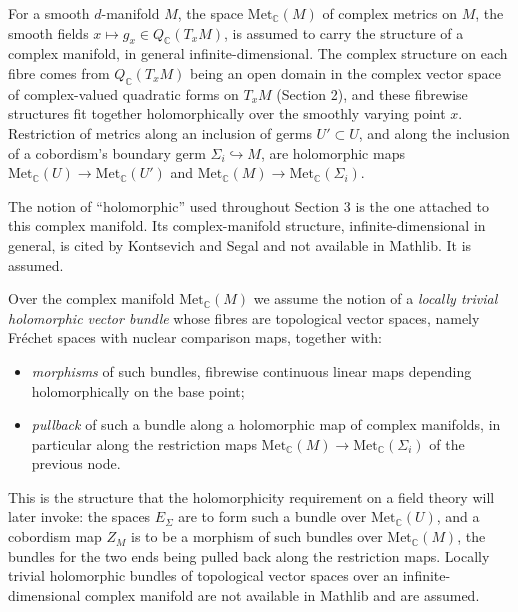 \begin{definition}
  \label{def:metc-complex-manifold}
  \notready
  For a smooth $d$-manifold $M$, the space $\mathrm{Met}_{\mathbb C}(M)$ of
  complex metrics on $M$, the smooth fields
  $x \mapsto g_x \in Q_{\mathbb C}(T_x M)$, is assumed to carry the structure of
  a complex manifold, in general infinite-dimensional. The complex structure on
  each fibre comes from $Q_{\mathbb C}(T_x M)$ being an open domain in the
  complex vector space of complex-valued quadratic forms on $T_x M$ (Section 2),
  and these fibrewise structures fit together holomorphically over the smoothly
  varying point $x$. Restriction of metrics along an inclusion of germs
  $U' \subset U$, and along the inclusion of a cobordism's boundary germ
  $\Sigma_i \hookrightarrow M$, are holomorphic maps
  $\mathrm{Met}_{\mathbb C}(U) \to \mathrm{Met}_{\mathbb C}(U')$ and
  $\mathrm{Met}_{\mathbb C}(M) \to \mathrm{Met}_{\mathbb C}(\Sigma_i)$.

  The notion of ``holomorphic'' used throughout Section 3 is the one attached to
  this complex manifold. Its complex-manifold structure, infinite-dimensional in
  general, is cited by Kontsevich and Segal and not available in Mathlib. It is
  assumed.
\end{definition}

\begin{definition}
  \label{def:holomorphic-bundle}
  \notready
  Over the complex manifold $\mathrm{Met}_{\mathbb C}(M)$ we assume the notion of
  a \emph{locally trivial holomorphic vector bundle} whose fibres are
  topological vector spaces, namely Fréchet spaces with nuclear comparison maps,
  together with:
  \begin{itemize}
    \item \emph{morphisms} of such bundles, fibrewise continuous linear maps
      depending holomorphically on the base point;
    \item \emph{pullback} of such a bundle along a holomorphic map of complex
      manifolds, in particular along the restriction maps
      $\mathrm{Met}_{\mathbb C}(M) \to \mathrm{Met}_{\mathbb C}(\Sigma_i)$ of the
      previous node.
  \end{itemize}

  This is the structure that the holomorphicity requirement on a field theory
  will later invoke: the spaces $E_{\Sigma}$ are to form such a bundle over
  $\mathrm{Met}_{\mathbb C}(U)$, and a cobordism map $Z_M$ is to be a morphism of
  such bundles over $\mathrm{Met}_{\mathbb C}(M)$, the bundles for the two ends
  being pulled back along the restriction maps. Locally trivial holomorphic
  bundles of topological vector spaces over an infinite-dimensional complex
  manifold are not available in Mathlib and are assumed.
\end{definition}

